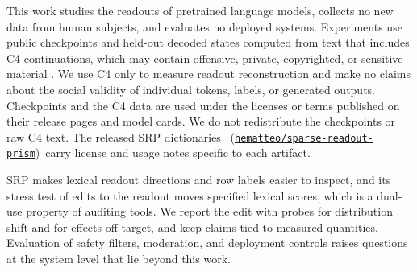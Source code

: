 This work studies the readouts of pretrained language models, collects no
new data from human subjects, and evaluates no deployed systems. Experiments use public
checkpoints and held-out decoded states computed from text that
includes C4 continuations, which may contain offensive, private,
copyrighted, or sensitive material
\citep{raffel2020exploring,dodge2021documenting}. We use C4 only to measure
readout reconstruction and make no claims about the social validity of
individual tokens, labels, or generated outputs. Checkpoints and
the C4 data are used under the licenses or terms published on their
release pages and model cards. We do not redistribute the
checkpoints or raw C4 text. The released SRP dictionaries%
\ifpreprintmode\ (\href{https://huggingface.co/hematteo/sparse-readout-prism}{\texttt{hematteo/sparse-readout-prism}})\fi\
carry license and usage notes specific to each artifact.

SRP makes lexical readout directions and row labels easier to inspect,
and its stress test of edits to the readout moves specified lexical scores, which
is a dual-use property of auditing tools. We report the edit with
probes for distribution shift and for effects off target, and keep claims tied to
measured quantities. Evaluation of safety filters, moderation, and deployment
controls raises questions at the system level that lie beyond this work.
